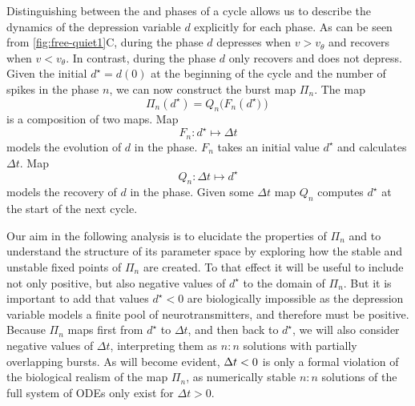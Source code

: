 Distinguishing between the \free{} and \suppressed{} phases of a cycle allows us to describe the dynamics of the depression variable $d$ explicitly for each phase.
As can be seen from \cref{fig:free-quiet1}C, during the \free{} phase $d$ depresses when $v > v_\theta$ and recovers when $v < v_\theta$.
In contrast, during the \suppressed{} phase $d$ only recovers and does not depress.
Given the initial $d^{\star} = d(0)$ at the beginning of the cycle and the number of spikes in the \free{} phase $n$, we can now construct the burst map $\Pi_n$.
The map
\begin{equation}
	\Pi_n(d^\star)=Q_n\big(F_n(d^\star\big))
\end{equation}
\noindent
is a composition of two maps. Map
\begin{equation}
	F_n:d^\star\mapsto \Delta t
\end{equation}
models the evolution of $d$ in the \free{} phase.
$F_n$ takes an initial value $d^{\star}$ and calculates $\Delta t$.
Map
\begin{equation}
	Q_n:\Delta t \mapsto d^{\star}
\end{equation}
models the recovery of $d$ in the \suppressed{} phase.
Given some $\Delta t$ map $Q_n$ computes $d^\star$ at the start of the next cycle.

Our aim in the following analysis is to elucidate the properties of $\Pi_n$ and to understand the structure of its parameter space by exploring how the stable and unstable fixed points of $\Pi_{n}$ are created.
To that effect it will be useful to include not only positive, but also negative values of $d^{\star}$ to the domain of $\Pi_{n}$.
But it is important to add that values $d^{\star}<0$ are biologically impossible as the depression variable models a finite pool of neurotransmitters, and therefore must be positive.
Because $\Pi_{n}$ maps first from $d^{\star}$ to $\Delta t$, and then back to $d^{\star}$, we will also consider negative values of $\Delta t$, interpreting them as $n:n$ solutions with partially overlapping bursts.
As will become evident, $\Delta t<0$ is only a formal violation of the biological realism of the map $\Pi_{n}$, as numerically stable $n:n$ solutions of the full system of ODEs only exist for $\Delta t>0$.

